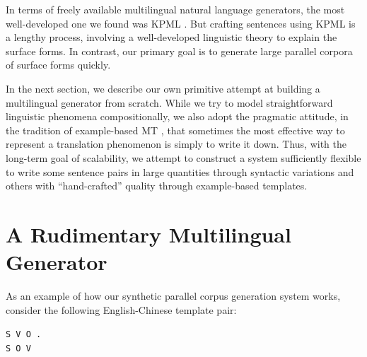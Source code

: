 % 

In terms of freely available multilingual natural language generators, the most well-developed one we found was KPML .
But crafting sentences using KPML is a lengthy process, involving a well-developed linguistic theory to explain the surface forms.
In contrast, our primary goal is to generate large parallel corpora of surface forms quickly. 

In the next section, we describe our own primitive attempt at building a multilingual generator from scratch. 
While we try to model straightforward linguistic phenomena compositionally, we also adopt the pragmatic attitude, in the tradition of example-based MT , that sometimes the most effective way to represent a translation phenomenon is simply to write it down.
Thus, with the long-term goal of scalability, we attempt to construct a system sufficiently flexible to write some sentence pairs in large quantities through syntactic variations and others with ``hand-crafted'' quality through example-based templates.


\section{A Rudimentary Multilingual Generator}
\label{sec:generator}




As an example of how our synthetic parallel corpus generation system works, consider the following English-Chinese template pair:

\begin{center} \begin{small} 
{\tt S V O .} \\
{\tt S  O V }
\end{small} \end{center} 


